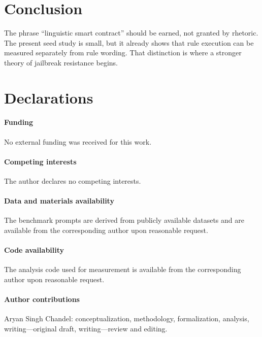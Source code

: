 \documentclass{svjour3}
\begin{document}
\section{Conclusion}
The phrase ``linguistic smart contract'' should be earned, not granted by rhetoric. The present seed study is small, but it already shows that rule execution can be measured separately from rule wording. That distinction is where a stronger theory of jailbreak resistance begins.

\section*{Declarations}
\paragraph{Funding} No external funding was received for this work.
\paragraph{Competing interests} The author declares no competing interests.
\paragraph{Data and materials availability} The benchmark prompts are derived from publicly available datasets and are available from the corresponding author upon reasonable request.
\paragraph{Code availability} The analysis code used for measurement is available from the corresponding author upon reasonable request.
\paragraph{Author contributions} Aryan Singh Chandel: conceptualization, methodology, formalization, analysis, writing---original draft, writing---review and editing.



\end{document}
